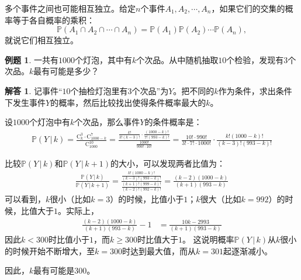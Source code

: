 \documentclass[12pt,UTF8]{ctexbook}
\theoremstyle{definition}
\newtheorem{et}{例题}[section]
\newtheorem*{so}{解答}
\theoremstyle{plain}
\begin{document}
多个事件之间也可能相互独立。给定$n$个事件$A_1, A_2, \cdots, A_n$，如果它们的交集的概率等于各自概率的乘积：
$$\mathbb{P}(A_1\cap A_2\cap \cdots \cap A_n) = \mathbb{P}(A_1) \mathbb{P}(A_2) \cdots \mathbb{P}(A_n),$$
就说它们相互独立。

\begin{et}
    一共有$1000$个灯泡，其中有$k$个次品。从中随机抽取$10$个检验，发现有$3$个次品。$k$最有可能是多少？
\end{et}

\begin{so}
    记事件“$10$个抽检灯泡里有$3$个次品”为$Y$。把不同的$k$作为条件，求出条件下发生事件$Y$的概率，然后比较找出使得条件概率最大的$k$。

    设$1000$个灯泡中有$k$个次品，那么事件$Y$的条件概率是：
    \begin{align*}
        \mathbb{P}(Y \,|\, k ) = \frac{\mathrm{C}_{k}^3 \cdot \mathrm{C}_{1000-k}^7}{\mathrm{C}_{1000}^{10}} = \frac{\frac{k!}{3!(k-3)!}\cdot \frac{(1000-k)!}{7!(993-k)!}}{\frac{1000!}{990!\cdot 10!}} = \frac{10!\cdot 990!}{3!\cdot 7!\cdot 1000!}\cdot \frac{k! (1000-k)!}{(k-3)!(993-k)!}
    \end{align*}

    比较$\mathbb{P}(Y \,|\, k )$和$\mathbb{P}(Y \,|\, k+1 )$的大小，可以发现两者比值为：
    \begin{align*}
        \frac{\mathbb{P}(Y \,|\, k )}{\mathbb{P}(Y \,|\, k + 1 )}= \frac{\frac{k! (1000-k)!}{(k-3)!(993-k)!}}{\frac{(k+1)! (999-k)!}{(k-2)!(992-k)!}} = \frac{(k - 2)(1000 - k)}{(k + 1)(993 - k)}
    \end{align*}
    可以看到，$k$很小（比如$k=3$）的时候，比值小于$1$；$k$很大（比如$k=992$）的时候，比值大于$1$。实际上，
    \begin{align*}
        \frac{(k - 2)(1000 - k)}{(k + 1)(993 - k)} - 1 &= \frac{10k -2993}{(k + 1)(993 - k)}
    \end{align*}
    因此$k<300$时比值小于$1$，而$k\geqslant 300$时比值大于$1$。
    这说明概率$\mathbb{P}(Y \,|\, k )$从$k$很小的时候开始不断增大，至$k=300$时达到最大值，而从$k=301$起逐渐减小。

    因此，$k$最有可能是$300$。
\end{so}
\end{document}
